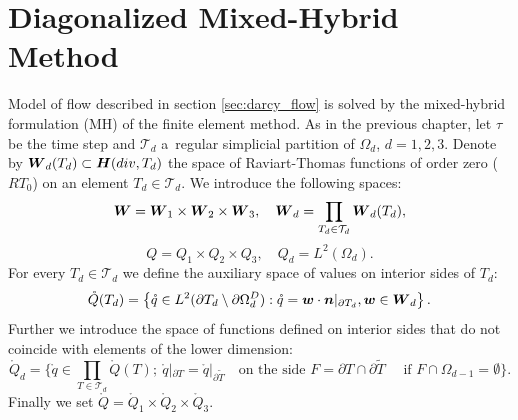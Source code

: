 \section{Diagonalized Mixed-Hybrid Method}
\def\mr{\mathring}
Model of flow described in section \ref{sec:darcy_flow} is solved by
the mixed-hybrid formulation (MH) of the finite element method.
As in the previous chapter, let
$\tau$ be the time step and $\mathcal T_d$ a~regular simplicial partition of $\Omega_d$, $d=1,2,3$.
Denote by $\mathbf{\boldsymbol{W}}_d(T_d)\subset \mathbf{\boldsymbol{H}}(div,T_d)$
 the space of Raviart-Thomas functions of order zero ($RT_0$) on an element $T_d\in 
\mathcal T_d$.
We introduce the following spaces:
\[
    \mathbf{\boldsymbol{W}} =  \mathbf{\boldsymbol{W}}_1 \times \mathbf{\boldsymbol{W}}_2 \times \mathbf{\boldsymbol{W}}_3,\quad
    \mathbf{\boldsymbol{W}}_d = \prod_{T_d\in \mathcal T_d} \mathbf{\boldsymbol{W}}_d(T_d),
\]
\begin{equation}
Q=Q_{1}\times Q_{2}\times Q_{3},
\quad
Q_{d}=L^{2}\left(  \Omega_{d}\right).
\end{equation}
For every $T_d\in \mathcal T_d$ we define the auxiliary space of values on interior sides of $T_d$:
\begin{equation}
    \mr Q(T_d)=\left\{  \mr q\in 
    L^{2}(\partial T_d \setminus  \partial\Omega_d^D):
    \mr q =\vc w\cdot \vc n|_{\partial T_d},
    \vc w\in\vc W_d%
    \right\}.
\end{equation}
Further we introduce the space of functions defined on interior sides that do not coincide with elements of the lower dimension:
\begin{equation}
    \mr Q_d=\Big\{
        \mr q\in\prod_{T \in \mathcal T_d} \mr Q(T);
        \ \mr q|_{\partial T}=\mr q|_{\partial \tilde T}%
        \quad\text{on the side }F=\partial T\cap\partial \tilde T
        \quad\text{ if }F\cap\Omega_{d-1}=\emptyset
    \Big\}.
\end{equation}
Finally we set $\mr Q = \mr Q_1 \times \mr Q_2 \times \mr Q_3$.

